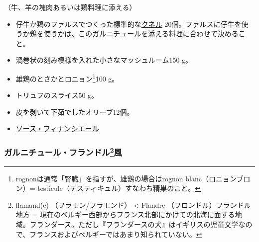\begin{recette}


（牛、羊の塊肉あるいは鶏料理に添える）

\begin{itemize}
\item
  仔牛か鶏のファルスでつくった標準的な\protect\hyperlink{quenelles-diverses}{クネル}
  20個。ファルスに仔牛を使うか鶏を使うかは、このガルニチュールを添える料理に合わせて決めること。
\item
  渦巻状の刻み模様を入れた小さなマッシュルーム150 g。
\item
  雄鶏のとさかとロニョン\footnote{rognonは通常「腎臓」を指すが、雄鶏の場合はrognon
    blanc（ロニョンブロン）=
    testicule（テスティキュル）すなわち精巣のこと。}100 g。
\item
  トリュフのスライス50 g。
\item
  皮を剥いて下茹でしたオリーブ12個。
\item
  \protect\hyperlink{sauce-financiere}{ソース・フィナンシエール}
\end{itemize}

\atoaki{}

\hypertarget{garniture-a-la-flamande}{%
\subsubsection[ガルニチュール・フランドル風]{\texorpdfstring{ガルニチュール・フランドル\footnote{flamand(e)
  （フラモン/フラモンド） \textless{} Flandre
  （フロンドル）フランドル地方 =
  現在のベルギー西部からフランス北部にかけての北海に面する地域。フランダース。ただし『フランダースの犬』はイギリスの児童文学なので、フランスおよびベルギーではあまり知られていない。}風}{ガルニチュール・フランドル風}}\label{garniture-a-la-flamande}}




\end{recette}
